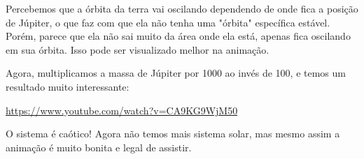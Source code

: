 \documentclass[12pt,a4paper]{article}
\begin{document}
Percebemos que a órbita da terra vai oscilando dependendo de onde fica a posição de Júpiter, o que faz com que ela não tenha uma "órbita" específica estável. Porém, parece que ela não sai muito da área onde ela está, apenas fica oscilando em sua órbita. Isso pode ser visualizado melhor na animação.

Agora, multiplicamos a massa de Júpiter por 1000 ao invés de 100, e temos um resultado muito interessante:

\url{https://www.youtube.com/watch?v=CA9KG9WjM50}

O sistema é caótico! Agora não temos mais sistema solar, mas mesmo assim a animação é muito bonita e legal de assistir.
\end{document}
